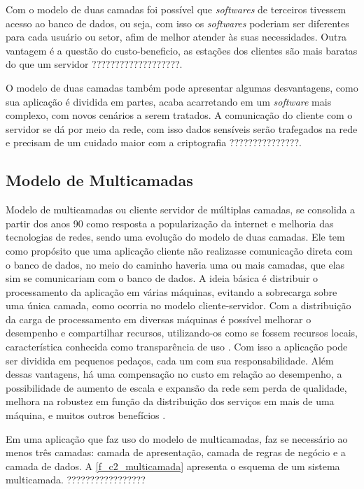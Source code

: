 Com o modelo de duas camadas foi possível que \textit{softwares} de terceiros tivessem acesso ao banco de dados, ou seja, com isso os \textit{softwares} poderiam ser diferentes para cada usuário ou setor, afim de melhor atender às suas necessidades. Outra vantagem é a questão do custo-beneficio, as estações dos clientes são mais baratas do que um servidor ???????????????????.

O modelo de duas camadas também pode apresentar algumas desvantagens, como sua aplicação é dividida em partes, acaba acarretando em um \textit{software} mais complexo, com novos cenários a serem tratados. A comunicação do cliente com o servidor se dá por meio da rede, com isso dados sensíveis serão trafegados na rede e precisam de um cuidado maior com a criptografia ???????????????.

\subsection*{Modelo de Multicamadas}
Modelo de multicamadas ou cliente servidor de múltiplas camadas, se consolida a partir dos anos 90 como resposta a  popularização da internet e melhoria das tecnologias de redes, sendo  uma evolução do modelo de duas camadas. Ele tem como propósito  que uma aplicação cliente não realizasse comunicação direta com o banco de dados, no meio do caminho haveria uma ou mais camadas, que elas sim se comunicariam com o banco de dados. A ideia básica é distribuir o processamento da aplicação em várias máquinas, evitando a sobrecarga sobre uma única camada, como ocorria no modelo cliente-servidor. Com a distribuição da carga de processamento em diversas máquinas é possível melhorar o desempenho e compartilhar recursos, utilizando-os como se fossem recursos locais, característica conhecida como  transparência de uso \cite{devmediaMultiCamadaP12018}. Com isso a aplicação pode ser dividida em pequenos pedaços, cada um com sua responsabilidade. Além dessas vantagens, há uma compensação no custo em relação ao desempenho, a possibilidade de aumento de escala e expansão da rede sem perda de qualidade, melhora na robustez em função da distribuição dos serviços em mais de uma máquina, e muitos outros benefícios \cite{devmediaMultiCamadaP12018}.

Em uma aplicação que faz uso do  modelo de multicamadas, faz se necessário ao menos três camadas: camada de apresentação, camada de regras de negócio e a camada de dados. A \autoref{f_c2_multicamada} apresenta o esquema de um sistema multicamada. ?????????????????

